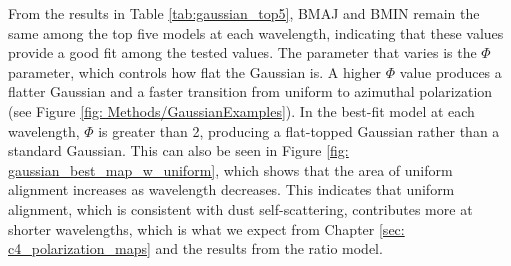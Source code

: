 From the results in Table \ref{tab:gaussian_top5}, BMAJ and BMIN remain the same among the top five models at each wavelength, indicating that these values provide a good fit among the tested values. The parameter that varies is the $\Phi$ parameter, which controls how flat the Gaussian is. A higher $\Phi$ value produces a flatter Gaussian and a faster transition from uniform to azimuthal polarization (see Figure \ref{fig: Methods/GaussianExamples}). In the best-fit model at each wavelength, $\Phi$ is greater than 2, producing a flat-topped Gaussian rather than a standard Gaussian. This can also be seen in Figure \ref{fig: gaussian_best_map_w_uniform}, which shows that the area of uniform alignment increases as wavelength decreases. This indicates that uniform alignment, which is consistent with dust self-scattering, contributes more at shorter wavelengths, which is what we expect from Chapter \ref{sec: c4_polarization_maps} and the results from the ratio model. 




